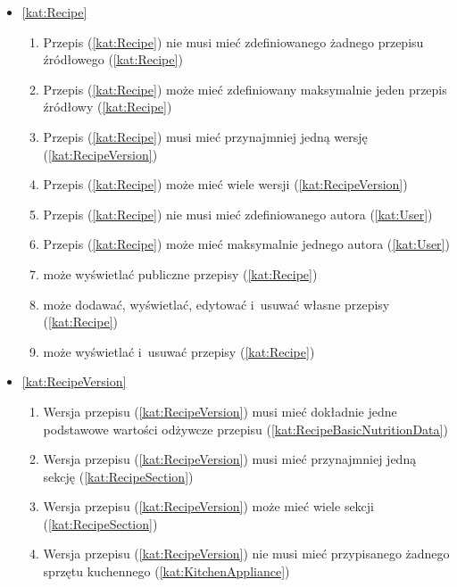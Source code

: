 \begin{itemize}[label={\textbf{Reguły dla}}, wide, labelwidth=!, labelindent=0pt]
    \setlength\itemsep{1.75em}
    \item\ref{kat:Recipe}\mynobreakpar
    \begin{enumerate}[label={\textbf{REG/2/\protect\twodigits{\arabic{enumi}}}}, wide, labelwidth=!, align=left, leftmargin=3cm]
        \item Przepis (\ref{kat:Recipe}) nie musi mieć zdefiniowanego żadnego przepisu źródłowego (\ref{kat:Recipe})
        \item Przepis (\ref{kat:Recipe}) może mieć zdefiniowany maksymalnie jeden przepis źródłowy (\ref{kat:Recipe})
        \item Przepis (\ref{kat:Recipe}) musi mieć przynajmniej jedną wersję (\ref{kat:RecipeVersion})
        \item Przepis (\ref{kat:Recipe}) może mieć wiele wersji (\ref{kat:RecipeVersion})
        \item Przepis (\ref{kat:Recipe}) nie musi mieć zdefiniowanego autora (\ref{kat:User})
        \item Przepis (\ref{kat:Recipe}) może mieć maksymalnie jednego autora (\ref{kat:User})
        \item {} może wyświetlać publiczne przepisy (\ref{kat:Recipe})
        \item {} może dodawać, wyświetlać, edytować i~usuwać własne przepisy (\ref{kat:Recipe})
        \item {} może wyświetlać i~usuwać przepisy (\ref{kat:Recipe})
    \end{enumerate}
    \item\ref{kat:RecipeVersion}\mynobreakpar
    \begin{enumerate}[label={\textbf{REG/2/\protect\twodigits{\arabic{enumi}}}}, wide, labelwidth=!, align=left, leftmargin=3cm, resume]
        \item Wersja przepisu (\ref{kat:RecipeVersion}) musi mieć dokładnie jedne podstawowe wartości odżywcze przepisu (\ref{kat:RecipeBasicNutritionData})
        \item Wersja przepisu (\ref{kat:RecipeVersion}) musi mieć przynajmniej jedną sekcję (\ref{kat:RecipeSection})
        \item Wersja przepisu (\ref{kat:RecipeVersion}) może mieć wiele sekcji (\ref{kat:RecipeSection})
        \item Wersja przepisu (\ref{kat:RecipeVersion}) nie musi mieć przypisanego żadnego sprzętu kuchennego (\ref{kat:KitchenAppliance})

\end{enumerate}
\end{itemize}
